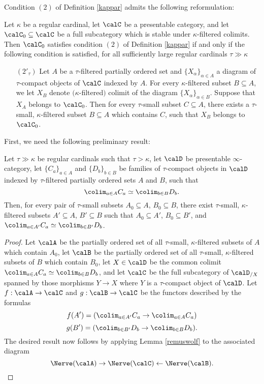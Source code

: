 Condition $(2)$ of Definition \ref{kappar} admits the following reformulation:

\begin{proposition}\label{reefa} Let $\kappa$ be a regular cardinal, let $\calC$ be a presentable category, and let $\calC_0 \subseteq \calC$ be a full subcategory which is stable under $\kappa$-filtered colimits. Then $\calC_0$ satisfies condition $(2)$ of Definition \ref{kappar} if and only if the following condition is satisfied, for all sufficiently large regular cardinals $\tau \gg \kappa$
\begin{itemize}
\item[$(2'_{\tau})$] Let $A$ be a $\tau$-filtered partially ordered set and
$\{ X_{\alpha} \}_{\alpha \in A}$ a diagram of $\tau$-compact objects of $\calC$ indexed by $A$.
For every $\kappa$-filtered subset $B \subseteq A$, we let
$X_B$ denote $(${}$\kappa$-filtered$)$ colimit of the diagram $\{ X_{\alpha} \}_{\alpha \in B}$.
Suppose that $X_{A}$ belongs to $\calC_0$. Then for every $\tau$-small subset $C \subseteq A$,
there exists a $\tau$-small, $\kappa$-filtered subset $B \subseteq A$ which contains $C$, such that
$X_B$ belongs to $\calC_0$. 
\end{itemize}
\end{proposition}

First, we need the following preliminary result:

\begin{lemma}\label{constunt}
Let $\tau \gg \kappa$ be regular cardinals such that $\tau > \kappa$, let $\calD$ be presentable $\infty$-category, let $\{ C_{a} \}_{a \in A}$ and $\{ D_{b} \}_{b \in B}$ be families of $\tau$-compact objects in $\calD$ indexed by $\tau$-filtered partially ordered sets $A$ and $B$, such that
$$ \colim_{a \in A} C_{a} \simeq \colim_{b \in B} D_{b}.$$
Then, for every pair of $\tau$-small subsets $A_0 \subseteq A$, $B_0 \subseteq B$, there
exist $\tau$-small, $\kappa$-filtered subsets $A' \subseteq A$, $B' \subseteq B$ such that
$A_0 \subseteq A'$, $B_0 \subseteq B'$, and $\colim_{a \in A'} C_a \simeq \colim_{b \in B'} D_b$.
\end{lemma}

\begin{proof}
Let $\calA$ be the partially ordered set of all $\tau$-small, $\kappa$-filtered subsets of
$A$ which contain $A_0$, let $\calB$ be the partially ordered set of all $\tau$-small, $\kappa$-filtered subsets of $B$ which contain $B_0$, let $X \in \calD$ be the common colimit
$ \colim_{a \in A} C_{a} \simeq \colim_{b \in B} D_{b}$, and let $\calC$ be the full subcategory
of $\calD_{/X}$ spanned by those morphisms $Y \rightarrow X$ where $Y$ is a $\tau$-compact object of $\calD$. Let $f: \calA \rightarrow \calC$ and $g: \calB \rightarrow \calC$ be the functors described by the formulas
$$f( A' ) = ( \colim_{a \in A'} C_{a} \rightarrow \colim_{a \in A} C_a )$$
$$g( B' ) = ( \colim_{b \in B'} D_{b} \rightarrow \colim_{b \in B} D_b ).$$
The desired result now follows by applying Lemma \ref{remuswolf} to the associated diagram
$$ \Nerve(\calA) \rightarrow \Nerve(\calC) \leftarrow \Nerve(\calB).$$
\end{proof}

